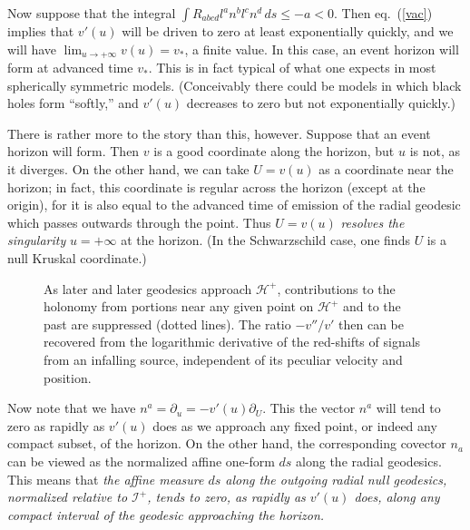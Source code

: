 \documentclass[12pt]{article}
\newcommand{\scrif}{{{\mathscr I}^{+}}}
\newcommand{\Hf}{{{\mathscr H}^{+}}} %
\newcommand{\vv}{{v}}
\begin{document}
Now suppose that the integral $\int R_{abcd}l^an^bl^cn^d\, ds\leq -a<0$.  Then eq.~(\ref{vac}) implies that $\vv '(u)$ will be driven to zero at least exponentially quickly, and we will have $\lim _{u\to +\infty} \vv (u)=v_*$, a finite value.  In this case, an event horizon will form at advanced time $v_*$.  This is in fact typical of what one expects in most spherically symmetric models.  (Conceivably  there could be models in which black holes form ``softly,'' and $\vv '(u)$ decreases to zero but not exponentially quickly.)

There is rather more to the story than this, however.  Suppose that an event horizon will form.  Then $v$ is a good coordinate along the horizon, but $u$ is not, as it diverges.  On the other hand, we can take $U=\vv (u)$ as a coordinate near the horizon; in fact, this coordinate is regular across the horizon (except at the origin), for it is also equal to the advanced time of emission of the radial geodesic which passes outwards through the point.  Thus $U=\vv (u)$ {\em resolves the singularity} $u=+\infty$ at the horizon.  (In the Schwarzschild case, one finds $U$ is a null Kruskal coordinate.)


\begin{figure}[t]
\caption{As later and later geodesics approach $\Hf$, contributions to the holonomy from portions near any given point on $\Hf$ and to the past are suppressed (dotted lines). 
The ratio $-\vv ''/\vv '$ then can be recovered from the logarithmic derivative of the red-shifts of signals from an infalling source,
independent of its peculiar velocity and position.}
\label{fig:spherhola}
\end{figure}

Now note that we have $n^a=\partial _u=-\vv'(u)\partial _U$.  This the vector $n^a$ will tend to zero as rapidly as $\vv' (u)$ does as we approach any fixed point, or indeed any compact subset, of the horizon.  
On the other hand, the corresponding covector $n_a$ can be viewed as the normalized affine one-form $ds$ along the radial geodesics.  
This means that {\em the affine measure $ds$ along the outgoing radial null geodesics, normalized relative to $\scrif$, tends to zero, as rapidly as $\vv '(u)$ does, along any compact interval
of the geodesic approaching the horizon.}
\end{document}
